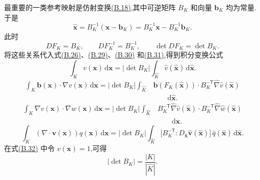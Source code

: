 \begin{example}[仿射变换]\label{ex:appendix-b-62}
最重要的一类参考映射是仿射变换\hyperref[eq:appendix-b-18]{(B.18)},其中可逆矩阵 $B_K$ 和向量 $\bm b_K$ 均为常量.于是
\[
 \widehat{\bm x}=B_K^{-1}(\bm x-\bm b_K)
 =B_K^{-1}\bm x-B_K^{-1}\bm b_K.
\]
此时
\[
 DF_K=B_K,\qquad
 DF_K^{-1}=B_K^{-1},\qquad
 \det DF_K=\det B_K.
\]
将这些关系代入式\hyperref[eq:appendix-b-26]{(B.26)}、\hyperref[eq:appendix-b-29]{(B.29)}、\hyperref[eq:appendix-b-30]{(B.30)} 和\hyperref[eq:appendix-b-31]{(B.31)},得到积分变换公式
\begin{equation}\label{eq:appendix-b-32}
 \int_K v(\bm x)\,\mathrm d\bm x
 =|\det B_K|\int_{\widehat K}\widehat v(\widehat{\bm x})
   \,\mathrm d\widehat{\bm x}.
\end{equation}
\begin{equation}\label{eq:appendix-b-33}
\begin{aligned}
 \int_K\bm b(\bm x)\cdot\nabla v(\bm x)\,\mathrm d\bm x
 =|\det B_K|\int_{\widehat K}&\bm b(F_K(\widehat{\bm x}))\cdot
 B_K^{-\mathsf T}\widehat\nabla\widehat v(\widehat{\bm x})\\
 &\qquad\mathrm d\widehat{\bm x}.
\end{aligned}
\end{equation}
\begin{equation}\label{eq:appendix-b-34}
\begin{aligned}
 \int_K\nabla v(\bm x)\cdot\nabla w(\bm x)\,\mathrm d\bm x
 =|\det B_K|\int_{\widehat K}&
   B_K^{-\mathsf T}\widehat\nabla\widehat v(\widehat{\bm x})\cdot
   B_K^{-\mathsf T}\widehat\nabla\widehat w(\widehat{\bm x})\\
 &\qquad\mathrm d\widehat{\bm x}.
\end{aligned}
\end{equation}
\begin{equation}\label{eq:appendix-b-35}
 \int_K(\nabla\cdot\bm v(\bm x))q(\bm x)\,\mathrm d\bm x
 =|\det B_K|\int_{\widehat K}
   \bigl[B_K^{-\mathsf T}:D_{\widehat{\bm x}}\widehat{\bm v}(\widehat{\bm x})\bigr]
   \,\widehat q(\widehat{\bm x})\,\mathrm d\widehat{\bm x}.
\end{equation}
在式\hyperref[eq:appendix-b-32]{(B.32)} 中令 $v(\bm x)=1$,可得
\begin{equation}\label{eq:appendix-b-36}
 |\det B_K|=\frac{|K|}{|\widehat K|}.
\end{equation}
\end{example}
